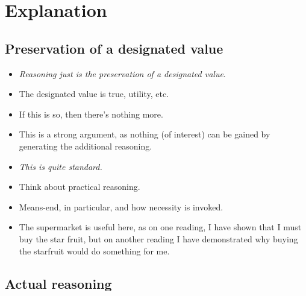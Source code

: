 \documentclass[10pt]{article}
\begin{document}
\section{Explanation}
\label{sec:explanation-1}

\subsection{Preservation of a designated value}
\label{sec:pres-design-value}

\begin{itemize}
\item \emph{Reasoning just is the preservation of a designated value}.
\item The designated value is true, utility, etc.
\item If this is so, then there's nothing more.
\item This is a strong argument, as nothing (of interest) can be gained by generating the additional reasoning.
\end{itemize}

\begin{itemize}
\item \emph{This is quite standard.}
\item Think about practical reasoning.
\item Means-end, in particular, and how necessity is invoked.
\item The supermarket is useful here, as on one reading, I have shown that I must buy the star fruit, but on another reading I have demonstrated why buying the starfruit would do something for me.
\end{itemize}

\subsection{Actual reasoning}
\label{sec:actual-reasoning}
\end{document}
